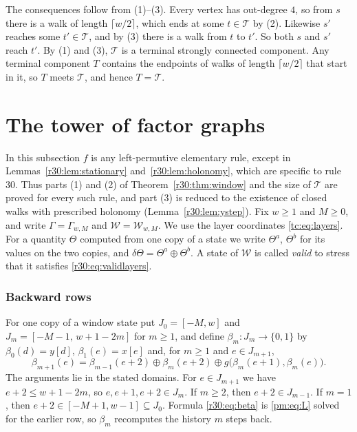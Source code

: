 The consequences follow from (1)--(3). Every vertex has out-degree $4$, so from $s$ there is a walk of length $\lceil w/2\rceil$, which ends at some $t\in\mathcal{T}$ by (2). Likewise $s'$ reaches some $t'\in\mathcal{T}$, and by (3) there is a walk from $t$ to $t'$. So both $s$ and $s'$ reach $t'$. By (1) and (3), $\mathcal{T}$ is a terminal strongly connected component. Any terminal component $T$ contains the endpoints of walks of length $\lceil w/2\rceil$ that start in it, so $T$ meets $\mathcal{T}$, and hence $T=\mathcal{T}$.

\section{The tower of factor graphs}\label{r30:sec:windowproof}

In this subsection $f$ is any left-permutive elementary rule, except in Lemmas~\ref{r30:lem:stationary} and~\ref{r30:lem:holonomy}, which are specific to rule $30$. Thus parts (1) and (2) of Theorem~\ref{r30:thm:window} and the size of $\mathcal{T}$ are proved for every such rule, and part (3) is reduced to the existence of closed walks with prescribed holonomy (Lemma~\ref{r30:lem:ystep}). 
Fix $w\ge1$ and $M\ge0$, and write $\Gamma=\Gamma_{w,M}$ and $\mathcal{W}=\mathcal{W}_{w,M}$. We use the layer coordinates \eqref{tc:eq:layers}. For a quantity $\Theta$ computed from one copy of a state we write $\Theta^a$, $\Theta^b$ for its values on the two copies, and $\delta\Theta=\Theta^a\oplus\Theta^b$. A state of $\mathcal{W}$ is called \emph{valid} to stress that it satisfies \eqref{r30:eq:validlayers}.

\subsubsection*{Backward rows}
For one copy of a window state put $J_0=[-M,w]$ and $J_m=[-M-1,\,w+1-2m]$ for $m\ge1$, and define $\beta_m\colon J_m\to\{0,1\}$ by $\beta_0(d)=y[d]$, $\beta_1(e)=x[e]$ and, for $m\ge1$ and $e\in J_{m+1}$,
\begin{equation}\label{r30:eq:beta}
\beta_{m+1}(e)=\beta_{m-1}(e+2)\oplus\beta_m(e+2)\oplus g\bigl(\beta_m(e+1),\beta_m(e)\bigr).
\end{equation}
The arguments lie in the stated domains. For $e\in J_{m+1}$ we have $e+2\le w+1-2m$, so $e,e+1,e+2\in J_m$. If $m\ge2$, then $e+2\in J_{m-1}$. If $m=1$, then $e+2\in[-M+1,w-1]\subseteq J_0$. Formula \eqref{r30:eq:beta} is \eqref{pm:eq:L} solved for the earlier row, so $\beta_m$ recomputes the history $m$ steps back.

